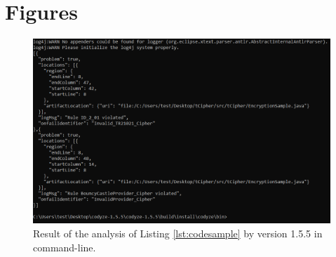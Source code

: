 \section{Figures}

\begin{figure}[H]
\centering
\includegraphics[scale = 1, angle = 90]{thesis/figures/codyze-1.5.5-fig.PNG}
\caption{Result of the analysis of Listing \ref{lst:codesample} by \codyze{} version 1.5.5 in command-line.}
\label{fig:codyzecl15}
\end{figure}